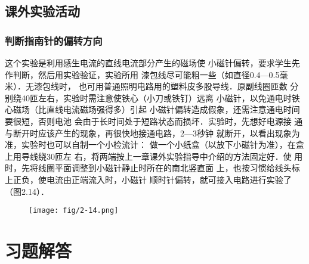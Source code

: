 \subsection{课外实验活动}
\subsubsection{判断指南针的偏转方向}
这个实验是利用感生电流的直线电流部分产生的磁场使
小磁针偏转，要求学生先作判断，然后用实验验证，实验所用
漆包线尽可能粗一些（如直径0.4—0.5毫米）．无漆包线时，
也可用普通照明电路用的塑料皮多股导线．原副线圈匝数
分别绕40匝左右，实验时需注意使铁心（小刀或铁钉）远离
小磁针，以免通电时铁心磁场（比直线电流磁场强得多）引起
小磁针偏转造成假象，还需注意通电时间要很短，否则电池
会由于长时间处于短路状态而损坏．实验时，先想好电源接
通与断开时应该产生的现象，再很快地接通电路，2—3秒钟
就断开，以看出现象为准，实验时也可以自制一个小检流计：
做一个小纸盒（以放下小磁针为准），在盒上用导线绕30匝左
右，将两端按上一章课外实验指导中介绍的方法固定好．使
用时，先将线圈平面调整到小磁针静止时所在的南北竖直面
上，也按习惯给线头标上正负，使电流由正端流入时，小磁针
顺时针偏转，就可接入电路进行实验了（图2.14）．
\begin{figure}[htp]
    \centering
\texttt{[image: fig/2-14.png]}
    \caption{}
\end{figure}


\section{习题解答}

